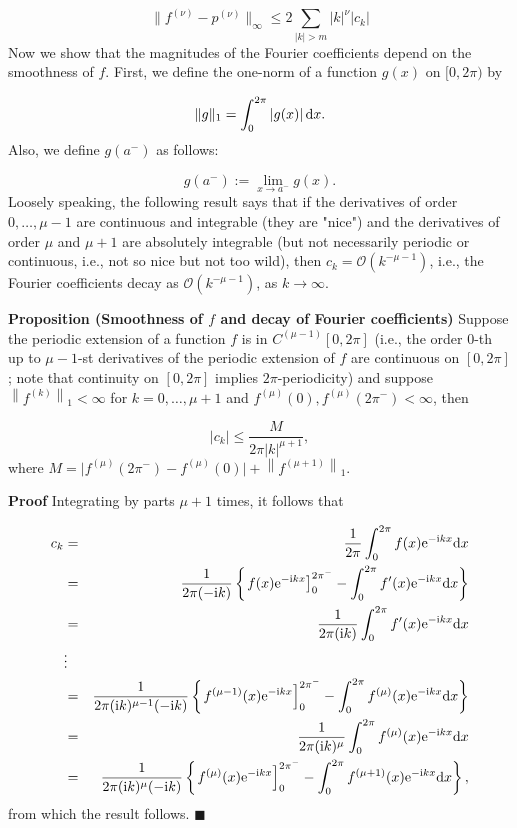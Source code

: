 \documentclass[12pt,a4paper]{article}
\begin{document}
\[
\| f^{(\nu)} - p^{(\nu)}  \|_{\infty} \leq  2\sum_{\vert k \vert > m} \vert k \vert^{\nu} \vert c_k \vert 
\]
Now we show that the magnitudes of the Fourier coefficients depend on the smoothness of $f$. First, we define the one-norm of a function $g(x)$ on $[0, 2\pi)$ by

\[
\| g \|_1 = \int_{0}^{2\pi}  \vert g(x) \vert \, {\rm d}x. 
\]
Also, we define $g(a^{-})$ as follows:

\[
g(a^{-}) :=\lim_{x\to a^{-}} g(x).
\]
Loosely speaking, the following result says that if the derivatives of order $0, \ldots, \mu-1$ are continuous and integrable (they are "nice") and the derivatives of order $\mu$ and $\mu+1$ are absolutely integrable (but not necessarily periodic or continuous, i.e., not so nice but not too wild), then $c_k = \mathcal{O}(k^{-\mu-1})$, i.e., the Fourier coefficients decay as $\mathcal{O}(k^{-\mu-1})$, as $k \to \infty$.

\textbf{Proposition (Smoothness of $f$ and decay of Fourier coefficients)} Suppose the periodic extension of a function $f$ is in $C^{(\mu-1)}[0, 2\pi]$ (i.e., the order $0$-th up to $\mu-1$-st derivatives of the periodic extension of $f$ are continuous on $[0, 2\pi]$; note that continuity on $[0, 2\pi]$ implies $2\pi$-periodicity) and suppose $\left\| f^{(k)} \right\|_{1} < \infty$ for $k = 0, \ldots, \mu+1$ and $f^{(\mu)}(0), f^{(\mu)}(2\pi^{-}) < \infty$, then

\[
\left\vert c_k   \right\vert \leq  \frac{M}{2\pi \vert k \vert^{\mu+1}},
\]
where $M =  \vert f^{(\mu)}(2\pi^{-}) - f^{(\mu)}(0)   \vert + \left\|f^{(\mu+1)}   \right\|_1$.

\textbf{Proof} Integrating by parts $\mu+1$ times, it follows that


\begin{eqnarray*}
c_k &=& \frac{1}{2\pi}\int_{0}^{2\pi}f(x) {\rm e}^{-{\rm i}kx}{\rm d}x  \\
    &=& \frac{1}{2\pi(-{\rm i}k)}\left\lbrace \left.  f(x) {\rm e}^{-{\rm i}kx}\right]_{0}^{2\pi^{-}}  - \int_{0}^{2\pi}f'(x) {\rm e}^{-{\rm i}kx} {\rm d}x \right\rbrace \\
    &=& \frac{1}{2\pi({\rm i}k)} \int_{0}^{2\pi}f'(x) {\rm e}^{-{\rm i}kx} {\rm d}x \\
    &\vdots &   \\
    & = &  \frac{1}{2\pi({\rm i}k)^{\mu-1}(-{\rm i}k)}\left\lbrace \left.  f^{(\mu-1)}(x) {\rm e}^{-{\rm i}kx}\right]_{0}^{2\pi^{-}}  - \int_{0}^{2\pi}f^{(\mu)}(x) {\rm e}^{-{\rm i}kx} {\rm d}x \right\rbrace \\
    &=& \frac{1}{2\pi({\rm i}k)^{\mu}} \int_{0}^{2\pi}f^{(\mu)}(x) {\rm e}^{-{\rm i}kx} {\rm d}x \\
    &=& \frac{1}{2\pi({\rm i}k)^{\mu}(-{\rm i}k)}\left\lbrace \left.  f^{(\mu)}(x) {\rm e}^{-{\rm i}kx}\right]_{0}^{2\pi^{-}}  - \int_{0}^{2\pi}f^{(\mu+1)}(x) {\rm e}^{-{\rm i}kx} {\rm d}x \right\rbrace,
    \end{eqnarray*}
from which the result follows. $\blacksquare$
\end{document}
